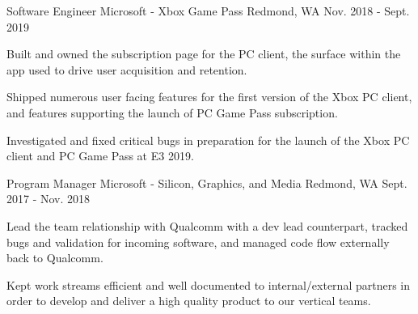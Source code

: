 \begin{cventries}
  \cventry
    {Software Engineer} %
    {Microsoft - Xbox Game Pass} %
    {Redmond, WA} %
    {Nov. 2018 - Sept. 2019} %
    {
      \begin{cvitems} %
        \item{Built and owned the subscription page for the PC client, the surface within the app used to drive user acquisition and retention.}
       	\item{Shipped numerous user facing features for the first version of the Xbox PC client, and features supporting the launch of PC Game Pass subscription.} 
	\item{Investigated and fixed critical bugs in preparation for the launch of the Xbox PC client and PC Game Pass at E3 2019.}	
      \end{cvitems}
    }

  \cventry
    {Program Manager} %
    {Microsoft - Silicon, Graphics, and Media} %
    {Redmond, WA} %
    {Sept. 2017 - Nov. 2018} %
    {
      \begin{cvitems} %
      	\item{Lead the team relationship with Qualcomm with a dev lead counterpart, tracked bugs and validation for incoming software, and managed code flow externally back to Qualcomm.}
      	\item{Kept work streams efficient and well documented to internal/external partners in order to develop and deliver a high quality product to our vertical teams.}
      \end{cvitems}
    }

\end{cventries}
